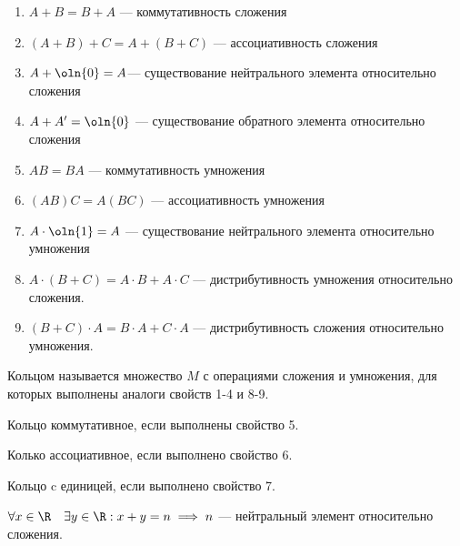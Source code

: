 \begin{enumerate}
    \item $A + B = B + A$ --- коммутативность сложения
    
    \item $(A + B) + C = A + (B + C)$ --- ассоциативность сложения
    
    \item $A + \oln{0} = A$--- существование нейтрального элемента относительно сложения
    
    \item $A + A' = \oln{0}$ --- существование обратного элемента относительно сложения
    
    \item $AB = BA$ --- коммутативность умножения
    
    \item $(AB)C = A(BC)$ --- ассоциативность умножения
    
    \item $A \cdot \oln{1} = A$ --- существование нейтрального элемента относительно умножения
    
    \item $A \cdot (B + C) = A \cdot B + A \cdot C$ --- дистрибутивность умножения относительно сложения.
    
    \item $(B + C) \cdot A = B \cdot A + C \cdot A$ --- дистрибутивность сложения относительно умножения.
\end{enumerate}

\begin{defn}
    Кольцом называется множество $M$ с операциями сложения и умножения, для которых выполнены аналоги свойств 1-4 и 8-9.
\end{defn}

\begin{defn}
    Кольцо коммутативное, если выполнены свойство 5.
\end{defn}

\begin{defn}
    Колько ассоциативное, если выполнено свойство 6.
\end{defn}

\begin{defn}
    Кольцо c единицей, если выполнено свойство 7.
\end{defn}

\begin{defn}
    $\forall x \in \R \quad \exists y \in \R: x + y = n \implies n$ --- нейтральный элемент относительно сложения.
\end{defn}    

